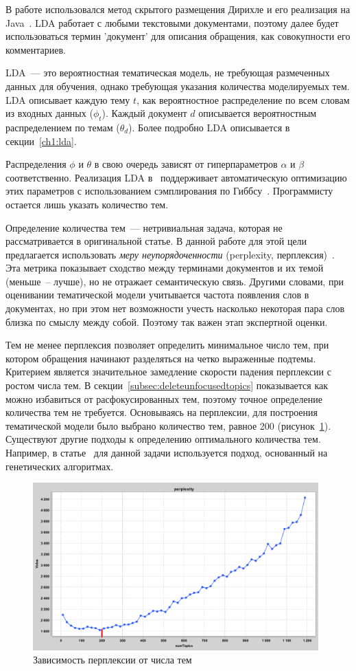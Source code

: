 В работе использовался метод скрытого размещения Дирихле и его реализация на Java~\cite{MALLET}. LDA работает с любыми текстовыми документами, поэтому далее будет использоваться термин 'документ' для описания обращения, как совокупности его комментариев.

LDA~--- это вероятностная тематическая модель, не требующая размеченных данных для обучения, однако требующая указания количества моделируемых тем. LDA описывает каждую тему $t$, как вероятностное распределение по всем словам из входных данных ($\phi_t$). Каждый документ $d$ описывается вероятностным распределением по темам ($\theta_d$). Более подробно LDA описывается в секции~\ref{ch1:lda}.

Распределения $\phi$ и $\theta$ в свою очередь зависят от гиперпараметров $\alpha$ и $\beta$ соответственно. Реализация LDA в~\cite{MALLET} поддерживает автоматическую оптимизацию этих параметров с использованием сэмплирования по Гиббсу~\cite{gibbs}. Программисту остается лишь указать количество тем.

Определение количества тем~--- нетривиальная задача, которая не рассматривается в оригинальной статье. В данной работе для этой цели предлагается использовать \textit{меру неупорядоченности} (perplexity, перплексия)~\cite{LDA}.  Эта метрика показывает сходство между терминами документов и их темой (меньше~-- лучше), но не отражает семантическую связь. Другими словами, при оценивании тематической модели учитывается частота появления слов в документах, но при этом нет возможности учесть насколько некоторая пара слов близка по смыслу между собой. Поэтому так важен этап экспертной оценки.

Тем не менее перплексия позволяет определить минимальное число тем, при котором обращения начинают разделяться на четко выраженные подтемы. Критерием является значительное замедление скорости падения перплексии с ростом числа тем. В секции~\ref{subsec:deleteunfocusedtopics} показывается как можно избавиться от расфокусированных тем, поэтому точное определение количества тем не требуется. Основываясь на перплексии, для построения тематической модели было выбрано количество тем, равное 200 (рисунок~\ref{fig:perpl}). Существуют другие подходы к определению оптимального количества тем. Например, в статье~\cite{TMuse} для данной задачи используется подход, основанный на генетических алгоритмах.

\begin{figure}[tph!]
\centerline{\includegraphics[width=11cm]{fig/perpl.png}}
    \caption{Зависимость перплексии от числа тем}
    \label{fig:perpl}
\end{figure}

